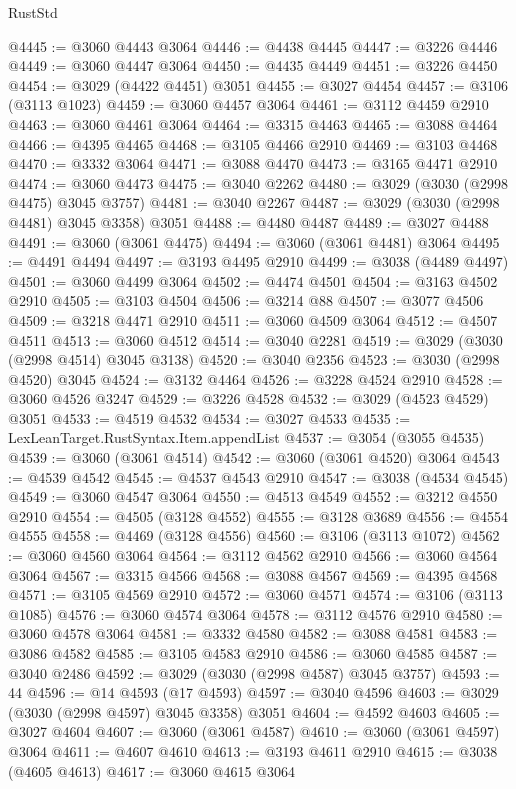 \begin{lexlean}{RustStd}
\begin{coremodule}
@4445 := @3060 @4443 @3064
@4446 := @4438 @4445
@4447 := @3226 @4446
@4449 := @3060 @4447 @3064
@4450 := @4435 @4449
@4451 := @3226 @4450
@4454 := @3029 (@4422 @4451) @3051
@4455 := @3027 @4454
@4457 := @3106 (@3113 @1023)
@4459 := @3060 @4457 @3064
@4461 := @3112 @4459 @2910
@4463 := @3060 @4461 @3064
@4464 := @3315 @4463
@4465 := @3088 @4464
@4466 := @4395 @4465
@4468 := @3105 @4466 @2910
@4469 := @3103 @4468
@4470 := @3332 @3064
@4471 := @3088 @4470
@4473 := @3165 @4471 @2910
@4474 := @3060 @4473
@4475 := @3040 @2262
@4480 := @3029 (@3030 (@2998 @4475) @3045 @3757)
@4481 := @3040 @2267
@4487 := @3029 (@3030 (@2998 @4481) @3045 @3358) @3051
@4488 := @4480 @4487
@4489 := @3027 @4488
@4491 := @3060 (@3061 @4475)
@4494 := @3060 (@3061 @4481) @3064
@4495 := @4491 @4494
@4497 := @3193 @4495 @2910
@4499 := @3038 (@4489 @4497)
@4501 := @3060 @4499 @3064
@4502 := @4474 @4501
@4504 := @3163 @4502 @2910
@4505 := @3103 @4504
@4506 := @3214 @88
@4507 := @3077 @4506
@4509 := @3218 @4471 @2910
@4511 := @3060 @4509 @3064
@4512 := @4507 @4511
@4513 := @3060 @4512
@4514 := @3040 @2281
@4519 := @3029 (@3030 (@2998 @4514) @3045 @3138)
@4520 := @3040 @2356
@4523 := @3030 (@2998 @4520) @3045
@4524 := @3132 @4464
@4526 := @3228 @4524 @2910
@4528 := @3060 @4526 @3247
@4529 := @3226 @4528
@4532 := @3029 (@4523 @4529) @3051
@4533 := @4519 @4532
@4534 := @3027 @4533
@4535 := LexLeanTarget.RustSyntax.Item.appendList
@4537 := @3054 (@3055 @4535)
@4539 := @3060 (@3061 @4514)
@4542 := @3060 (@3061 @4520) @3064
@4543 := @4539 @4542
@4545 := @4537 @4543 @2910
@4547 := @3038 (@4534 @4545)
@4549 := @3060 @4547 @3064
@4550 := @4513 @4549
@4552 := @3212 @4550 @2910
@4554 := @4505 (@3128 @4552)
@4555 := @3128 @3689
@4556 := @4554 @4555
@4558 := @4469 (@3128 @4556)
@4560 := @3106 (@3113 @1072)
@4562 := @3060 @4560 @3064
@4564 := @3112 @4562 @2910
@4566 := @3060 @4564 @3064
@4567 := @3315 @4566
@4568 := @3088 @4567
@4569 := @4395 @4568
@4571 := @3105 @4569 @2910
@4572 := @3060 @4571
@4574 := @3106 (@3113 @1085)
@4576 := @3060 @4574 @3064
@4578 := @3112 @4576 @2910
@4580 := @3060 @4578 @3064
@4581 := @3332 @4580
@4582 := @3088 @4581
@4583 := @3086 @4582
@4585 := @3105 @4583 @2910
@4586 := @3060 @4585
@4587 := @3040 @2486
@4592 := @3029 (@3030 (@2998 @4587) @3045 @3757)
@4593 := 44
@4596 := @14 @4593 (@17 @4593)
@4597 := @3040 @4596
@4603 := @3029 (@3030 (@2998 @4597) @3045 @3358) @3051
@4604 := @4592 @4603
@4605 := @3027 @4604
@4607 := @3060 (@3061 @4587)
@4610 := @3060 (@3061 @4597) @3064
@4611 := @4607 @4610
@4613 := @3193 @4611 @2910
@4615 := @3038 (@4605 @4613)
@4617 := @3060 @4615 @3064

\end{coremodule}
\end{lexlean}
